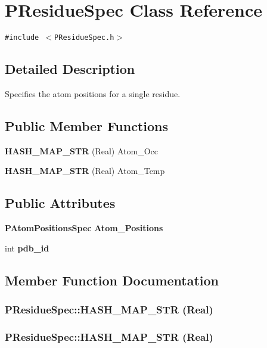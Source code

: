 \section{PResidue\-Spec Class Reference}
\label{classPResidueSpec}
{\tt \#include $<$PResidue\-Spec.h$>$}



\subsection{Detailed Description}
Specifies the atom positions for a single residue. 

\subsection*{Public Member Functions}
\begin{CompactItemize}
\item 
{\bf HASH\_\-MAP\_\-STR} (Real) Atom\_\-Occ
\item 
{\bf HASH\_\-MAP\_\-STR} (Real) Atom\_\-Temp
\end{CompactItemize}
\subsection*{Public Attributes}
\begin{CompactItemize}
\item 
{\bf PAtom\-Positions\-Spec} {\bf Atom\_\-Positions}
\item 
int {\bf pdb\_\-id}
\end{CompactItemize}


\subsection{Member Function Documentation}
\subsubsection{\setlength{\rightskip}{0pt plus 5cm}PResidue\-Spec::HASH\_\-MAP\_\-STR (Real)}\label{classPResidueSpec_dc98a4c9a35dc9774baed120068a4a28}


\subsubsection{\setlength{\rightskip}{0pt plus 5cm}PResidue\-Spec::HASH\_\-MAP\_\-STR (Real)}\label{classPResidueSpec_82b15a2e7b3b536ac9a6c2a68b203eae}




